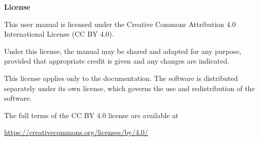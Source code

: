 \clearpage
\thispagestyle{plain}

\vspace*{2.3cm}

\begin{center}
{\LARGE\bfseries License}\par
\end{center}

\vspace{1.4cm}

\begingroup
\small
{}
\setlength{\parindent}{0pt}
\setlength{\parskip}{0.75em}

This user manual is licensed under the
Creative Commons Attribution 4.0 International License
(CC BY 4.0).

Under this license, the manual may be shared and adapted for any purpose,
provided that appropriate credit is given and any changes are indicated.

This license applies only to the documentation.
The \progname{} software is distributed separately under its own license,
which governs the use and redistribution of the software.

The full terms of the CC BY 4.0 license are available at

\begin{center}
\url{https://creativecommons.org/licenses/by/4.0/}
\end{center}

\par\endgroup
\clearpage